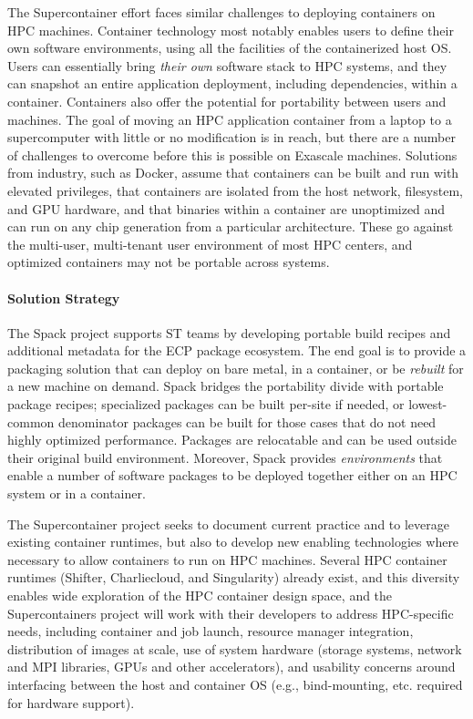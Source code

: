 The Supercontainer effort faces similar challenges to deploying
containers on HPC machines. Container technology most notably enables
users to define their own software environments, using all the facilities
of the containerized host OS.  Users can essentially bring {\it their
own} software stack to HPC systems, and they can snapshot an entire
application deployment, including dependencies, within a container.
Containers also offer the potential for portability between users and
machines. The goal of moving an HPC application container from a laptop
to a supercomputer with little or no modification is in reach, but there
are a number of challenges to overcome before this is possible on
Exascale machines.  Solutions from industry, such as Docker, assume that
containers can be built and run with elevated privileges, that containers
are isolated from the host network, filesystem, and GPU hardware, and
that binaries within a container are unoptimized and can run on any chip
generation from a particular architecture. These go against the
multi-user, multi-tenant user environment of most HPC centers, and
optimized containers may not be portable across systems.

\paragraph{Solution Strategy}

The Spack project supports ST teams by developing portable build recipes
and additional metadata for the ECP package ecosystem.  The end goal is
to provide a packaging solution that can deploy on bare metal, in a
container, or be {\it rebuilt} for a new machine on demand. Spack bridges
the portability divide with portable package recipes; specialized
packages can be built per-site if needed, or lowest-common denominator
packages can be built for those cases that do not need highly optimized
performance.  Packages are relocatable and can be used outside their
original build environment.  Moreover, Spack provides {\it environments}
that enable a number of software packages to be deployed together either
on an HPC system or in a container.

The Supercontainer project seeks to document current practice and to
leverage existing container runtimes, but also to develop new enabling
technologies where necessary to allow containers to run on HPC machines.
Several HPC container runtimes (Shifter, Charliecloud, and Singularity)
already exist, and this diversity enables wide exploration of the HPC
container design space, and the Supercontainers project will work with
their developers to address HPC-specific needs, including container and
job launch, resource manager integration, distribution of images at
scale, use of system hardware (storage systems, network and MPI
libraries, GPUs and other accelerators), and usability concerns around
interfacing between the host and container OS (e.g., bind-mounting,
etc. required for hardware support).

